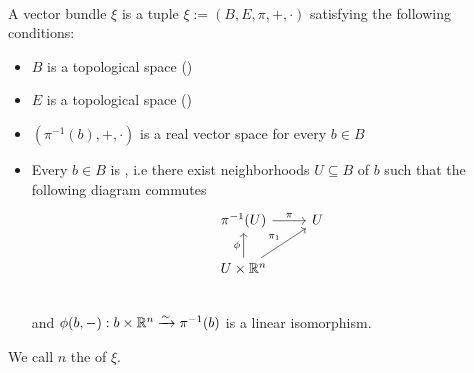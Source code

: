 \\ A vector bundle $\xi$ is a tuple $\xi := (B, E, \pi, +, \cdot)$ satisfying the following conditions:
\begin{itemize}
    \item $B$ is a topological space ()
    \item $E$ is a topological space ()
    \item $(\pi^{-1}(b), +, \cdot)$ is a real vector space for every $b \in B$
    \item Every $b \in B$ is , i.e there exist neighborhoods $U \subseteq B$ of $b$ such that the following diagram commutes
    \[\begin{tikzcd}
        \pi^{-1}(U) \ar[r, "\pi"] & U \\
        U \times \R^n \ar[u, "\phi"] \ar[ur, "\pi_1"]& \\
    \end{tikzcd}\]
    and $\phi(b, -): b \times \mathbb{R}^n \xrightarrow{\sim} \pi^{-1}(b)$ is a linear isomorphism.
\end{itemize}
We call $n$ the  of $\xi$.